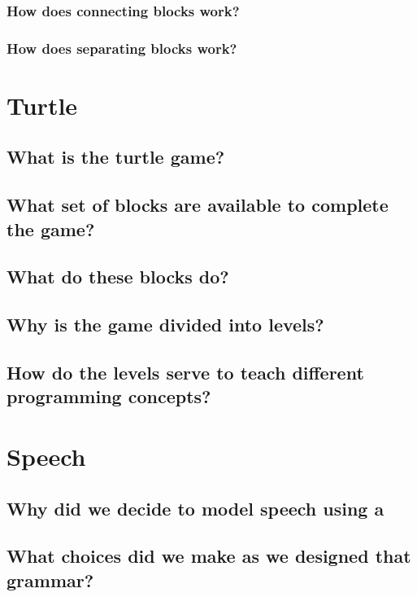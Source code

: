\documentclass[]{article}
\begin{document}
\subsubsection{How does connecting blocks work?}

\subsubsection{How does separating blocks work?}


\section{Turtle}

\subsection{What is the turtle game?}

\subsection{What set of blocks are available to complete the game?}

\subsection{What do these blocks do?}

\subsection{Why is the game divided into levels?}

\subsection{How do the levels serve to teach different programming concepts?}


\section{Speech}

\subsection{Why did we decide to model speech using a}

\subsection{What choices did we make as we designed that grammar?}
\end{document}
